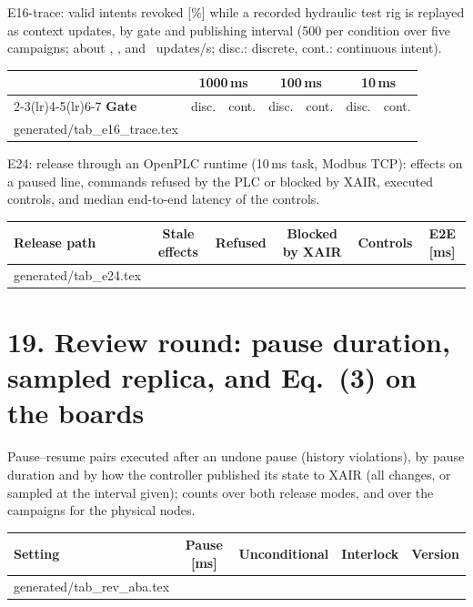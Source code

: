 \documentclass[11pt]{article}
\makeatletter
\newcommand{\gen}[1]{\@@input generated/#1.tex }
\makeatother
\begin{document}
\noindent E16-trace: valid intents revoked [\%] while a recorded hydraulic test rig is replayed as context updates, by gate and publishing interval (500 per condition over five campaigns; about \TraceRateA, \TraceRateB, and \TraceRateC\ updates/s; disc.: discrete, cont.: continuous intent).
\begin{center}\small\setlength{\tabcolsep}{4pt}
\begin{tabular}{@{}lcccccc@{}}
\toprule
& \multicolumn{2}{c}{\textbf{1000\,ms}} & \multicolumn{2}{c}{\textbf{100\,ms}} & \multicolumn{2}{c}{\textbf{10\,ms}} \\
\cmidrule(lr){2-3}\cmidrule(lr){4-5}\cmidrule(lr){6-7}
\textbf{Gate} & disc. & cont. & disc. & cont. & disc. & cont. \\
\midrule
\gen{tab_e16_trace}
\bottomrule
\end{tabular}
\end{center}

\noindent E24: release through an OpenPLC runtime (10\,ms task, Modbus TCP): effects on a paused line, commands refused by the PLC or blocked by XAIR, executed controls, and median end-to-end latency of the controls.
\begin{center}\footnotesize\setlength{\tabcolsep}{4pt}
\begin{tabular}{@{}lccccc@{}}
\toprule
\textbf{Release path} & \textbf{Stale effects} & \textbf{Refused} & \textbf{Blocked by XAIR} & \textbf{Controls} & \textbf{E2E [ms]} \\
\midrule
\gen{tab_e24}
\bottomrule
\end{tabular}
\end{center}


\section*{19. Review round: pause duration, sampled replica, and Eq.~(3) on the boards}
Pause--resume pairs executed after an undone pause (history violations), by pause duration and by how the controller published its state
to XAIR (all changes, or sampled at the interval given); counts over both release modes, and over the campaigns for the physical nodes.

\begin{center}\footnotesize\setlength{\tabcolsep}{3.5pt}
\begin{tabular}{@{}lcccc@{}}
\toprule
\textbf{Setting} & \textbf{Pause [ms]} & \textbf{Unconditional} & \textbf{Interlock} & \textbf{Version} \\
\midrule
\gen{tab_rev_aba}
\bottomrule
\end{tabular}\end{center}
\end{document}
